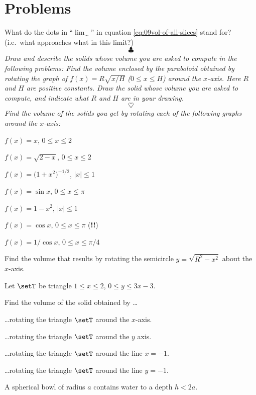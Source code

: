 \section{Problems}
\problemfont
\begin{multicols}{2}\setlength{\parindent}{0pt}
\problem \groupproblem What do the dots in ``$\lim_{\cdots}$'' in equation
\eqref{eq:09vol-of-all-slices} stand for? (i.e.\ what approaches what
in this limit?)
\[
\clubsuit
\]
\begingroup \itshape Draw and describe the solids whose volume you are
asked to compute in the following problems:
\endgroup
\problem 
Find the volume enclosed by the paraboloid obtained by rotating the
graph of $f(x) = R \sqrt{x/H}$ ($0\leq x\leq H$) around the $x$-axis.
Here $R$ and $H$ are positive constants.  Draw the solid whose volume
you are asked to compute, and indicate what $R$ and $H$ are in your
drawing.
\[
\heartsuit
\]
\begingroup\itshape
Find the volume of the solids you get by rotating each of the
following graphs around the $x$-axis:
\endgroup

\problem $f(x) = x$, $0\leq x\leq 2$ 

\problem $f(x) = \sqrt{2-x}$, $0\leq x\leq 2$ 

\problem $f(x) = \bigl(1+x^2\bigr)^{-1/2}$, $|x|\leq1$ 

\problem $f(x) = \sin x$, $0\leq x\leq \pi$ 

\problem $f(x) = 1-x^2$, $|x|\leq 1$ 

\problem $f(x) = \cos x$, $0\leq x\leq \pi$  \quad(\textbf{!!})

\problem $f(x) = 1/\cos x$, $0\leq x\leq \pi/4$ 

\problem  \label{ex:SphereVolume}
Find the volume that results by rotating the semicircle
$y=\sqrt{R^2-x^2}$ about the $x$-axis.

\problem Let $\setT$ be triangle $1\le x\le 2$, $0\le y\le 3x-3$.
 
Find the volume of the solid obtained by \ldots

\subprob \ldots rotating the triangle $\setT$ around the $x$-axis.

\subprob \ldots rotating the triangle
$\setT$ around the $y$ axis.

\subprob \ldots rotating the triangle
$\setT$ around the line $x=-1$.

\subprob \ldots rotating the triangle
$\setT$ around the line $y=-1$.



\problem A spherical bowl of radius $a$ contains water to a
depth $h<2a$. 


\end{multicols}
